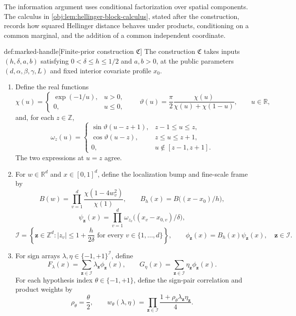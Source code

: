 \documentclass[11pt]{article}
\begin{document}
The information argument uses conditional factorization over spatial components. The calculus in \cref{obj:lem:hellinger-block-calculus}, stated after the construction, records how squared Hellinger distance behaves under products, conditioning on a common marginal, and the addition of a common independent coordinate.

\begin{algorithmv}{def:marked-handle}[Finite-prior construction \(\mathfrak C\)]
The construction \(\mathfrak C\) takes inputs \((h,\delta,a,b)\) satisfying \(0<\delta\le h\le1/2\) and \(a,b>0\), at the public parameters \((d,\alpha,\beta,\gamma,L)\) and fixed interior covariate profile \(x_0\).
\begin{enumerate}
\item Define the real functions
\[
\chi(u)=
\begin{cases}
\exp(-1/u),&u>0,\\
0,&u\le0,
\end{cases}
\qquad
\vartheta(u)=\frac{\pi}{2}\frac{\chi(u)}{\chi(u)+\chi(1-u)},
\qquad u\in\mathbb R,
\]
and, for each \(z\in\mathbb Z\),
\[
\omega_z(u)=
\begin{cases}
\sin\vartheta(u-z+1),&z-1\le u\le z,\\
\cos\vartheta(u-z),&z\le u\le z+1,\\
0,&u\notin[z-1,z+1].
\end{cases}
\]
The two expressions at \(u=z\) agree.

\item For \(w\in\mathbb R^d\) and \(x\in[0,1]^d\), define the localization bump and fine-scale frame by
\[
B(w)=\prod_{v=1}^d\frac{\chi(1-4w_v^2)}{\chi(1)},
\qquad
B_h(x)=B\bigl((x-x_0)/h\bigr),
\]
\[
\psi_{\mathbf z}(x)=
\prod_{v=1}^d
\omega_{z_v}\bigl((x_v-x_{0,v})/\delta\bigr),
\]
\[
\mathcal I=
\left\{\mathbf z\in\mathbb Z^d:
|z_v|\le1+\frac{h}{2\delta}
\text{ for every }v\in\{1,\ldots,d\}\right\},
\qquad
\phi_{\mathbf z}(x)=B_h(x)\psi_{\mathbf z}(x),
\quad \mathbf z\in\mathcal I.
\]

\item For sign arrays \(\lambda,\eta\in\{-1,+1\}^{\mathcal I}\), define
\[
F_\lambda(x)=
\sum_{\mathbf z\in\mathcal I}\lambda_{\mathbf z}\phi_{\mathbf z}(x),
\qquad
G_\eta(x)=
\sum_{\mathbf z\in\mathcal I}\eta_{\mathbf z}\phi_{\mathbf z}(x).
\]
For each hypothesis index \(\theta\in\{-1,+1\}\), define the sign-pair correlation and product weights by
\[
\rho_\theta=\frac{\theta}{2},
\qquad
w_\theta(\lambda,\eta)=
\prod_{\mathbf z\in\mathcal I}
\frac{1+\rho_\theta\lambda_{\mathbf z}\eta_{\mathbf z}}{4}.
\]


\end{enumerate}
\end{algorithmv}
\end{document}
